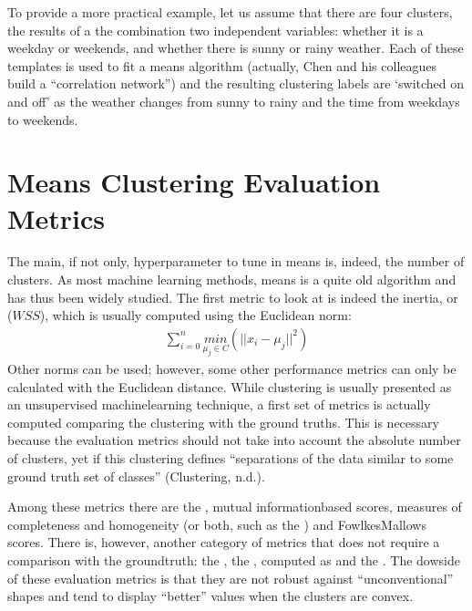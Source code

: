 \documentclass[letterpaper,10pt,english]{jupyterBook}
\begin{document}
\sphinxAtStartPar
To provide a more practical example, let us assume that there are four clusters, the results of a the combination two independent variables: whether it is a weekday or weekends, and whether there is sunny or rainy weather. Each of these templates is used to fit a \sphinxhyphen{}means algorithm (actually, Chen and his colleagues build a “correlation network”) and the resulting clustering labels are ‘switched on and off’ as the weather changes from sunny to rainy and the time from weekdays to weekends.


\section{\sphinxhyphen{}Means Clustering Evaluation Metrics}
\label{\detokenize{04-stations_kmeans:k-means-clustering-evaluation-metrics}}
\sphinxAtStartPar
The main, if not only, hyperparameter to tune in \sphinxhyphen{}means is, indeed, the number of clusters.
As most machine learning methods, \sphinxhyphen{}means is a quite old algorithm and has thus been widely studied.
The first metric to look at is indeed the inertia, or  (\(WSS\)), which is usually computed using the Euclidean norm:
\begin{equation*}
\begin{split}
\sum_{i=0}^{n}\underset{\mu_{j}\in{C}}{min}(||x_{i} - \mu_{j}||^2)
\end{split}
\end{equation*}
\sphinxAtStartPar
Other norms can be used; however, some other performance metrics can only be calculated with the Euclidean distance. While clustering is usually presented as an unsupervised machine\sphinxhyphen{}learning technique, a first set of metrics is actually computed comparing the clustering with the ground truths. This is necessary because the evaluation metrics should not take into account the absolute number of clusters, yet if this clustering defines “separations of the data similar to some ground truth set of classes” (Clustering, n.d.).

\sphinxAtStartPar
Among these metrics there are the , mutual information\sphinxhyphen{}based scores, measures of completeness and homogeneity (or both, such as the ) and Fowlkes\sphinxhyphen{}Mallows scores. There is, however, another category of metrics that does not require a comparison with the ground\sphinxhyphen{}truth: the , the , computed as  and  the . The dowside of these evaluation metrics is that they are not robust against “unconventional” shapes and tend to display “better” values when the clusters are convex.
\end{document}
